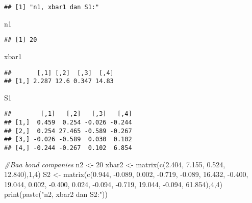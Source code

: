 \documentclass[
]{article}
\newenvironment{Shaded}{\begin{snugshade}}{\end{snugshade}}
\newcommand{\CommentTok}[1]{\textcolor[rgb]{0.56,0.35,0.01}{\textit{#1}}}
\newcommand{\DecValTok}[1]{\textcolor[rgb]{0.00,0.00,0.81}{#1}}
\newcommand{\FloatTok}[1]{\textcolor[rgb]{0.00,0.00,0.81}{#1}}
\newcommand{\FunctionTok}[1]{\textcolor[rgb]{0.00,0.00,0.00}{#1}}
\newcommand{\NormalTok}[1]{#1}
\newcommand{\OtherTok}[1]{\textcolor[rgb]{0.56,0.35,0.01}{#1}}
\newcommand{\SpecialCharTok}[1]{\textcolor[rgb]{0.00,0.00,0.00}{#1}}
\newcommand{\StringTok}[1]{\textcolor[rgb]{0.31,0.60,0.02}{#1}}
\begin{document}
\begin{verbatim}
## [1] "n1, xbar1 dan S1:"
\end{verbatim}

\begin{Shaded}
\begin{Highlighting}[]
\NormalTok{n1}
\end{Highlighting}
\end{Shaded}

\begin{verbatim}
## [1] 20
\end{verbatim}

\begin{Shaded}
\begin{Highlighting}[]
\NormalTok{xbar1}
\end{Highlighting}
\end{Shaded}

\begin{verbatim}
##       [,1] [,2]  [,3]  [,4]
## [1,] 2.287 12.6 0.347 14.83
\end{verbatim}

\begin{Shaded}
\begin{Highlighting}[]
\NormalTok{S1}
\end{Highlighting}
\end{Shaded}

\begin{verbatim}
##        [,1]   [,2]   [,3]   [,4]
## [1,]  0.459  0.254 -0.026 -0.244
## [2,]  0.254 27.465 -0.589 -0.267
## [3,] -0.026 -0.589  0.030  0.102
## [4,] -0.244 -0.267  0.102  6.854
\end{verbatim}

\begin{Shaded}
\begin{Highlighting}[]
\CommentTok{\#Baa bond companies}
\NormalTok{n2 }\OtherTok{\textless{}{-}} \DecValTok{20}
\NormalTok{xbar2 }\OtherTok{\textless{}{-}} \FunctionTok{matrix}\NormalTok{(}\FunctionTok{c}\NormalTok{(}\FloatTok{2.404}\NormalTok{, }\FloatTok{7.155}\NormalTok{, }\FloatTok{0.524}\NormalTok{, }\FloatTok{12.840}\NormalTok{),}\DecValTok{1}\NormalTok{,}\DecValTok{4}\NormalTok{)}
\NormalTok{S2 }\OtherTok{\textless{}{-}} \FunctionTok{matrix}\NormalTok{(}\FunctionTok{c}\NormalTok{(}\FloatTok{0.944}\NormalTok{, }\SpecialCharTok{{-}}\FloatTok{0.089}\NormalTok{, }\FloatTok{0.002}\NormalTok{, }\SpecialCharTok{{-}}\FloatTok{0.719}\NormalTok{, }\SpecialCharTok{{-}}\FloatTok{0.089}\NormalTok{, }\FloatTok{16.432}\NormalTok{, }\SpecialCharTok{{-}}\FloatTok{0.400}\NormalTok{, }\FloatTok{19.044}\NormalTok{, }\FloatTok{0.002}\NormalTok{, }\SpecialCharTok{{-}}\FloatTok{0.400}\NormalTok{, }\FloatTok{0.024}\NormalTok{, }\SpecialCharTok{{-}}\FloatTok{0.094}\NormalTok{, }\SpecialCharTok{{-}}\FloatTok{0.719}\NormalTok{, }\FloatTok{19.044}\NormalTok{, }\SpecialCharTok{{-}}\FloatTok{0.094}\NormalTok{, }\FloatTok{61.854}\NormalTok{),}\DecValTok{4}\NormalTok{,}\DecValTok{4}\NormalTok{)}
\FunctionTok{print}\NormalTok{(}\FunctionTok{paste}\NormalTok{(}\StringTok{"n2, xbar2 dan S2:"}\NormalTok{))}
\end{Highlighting}
\end{Shaded}
\end{document}

